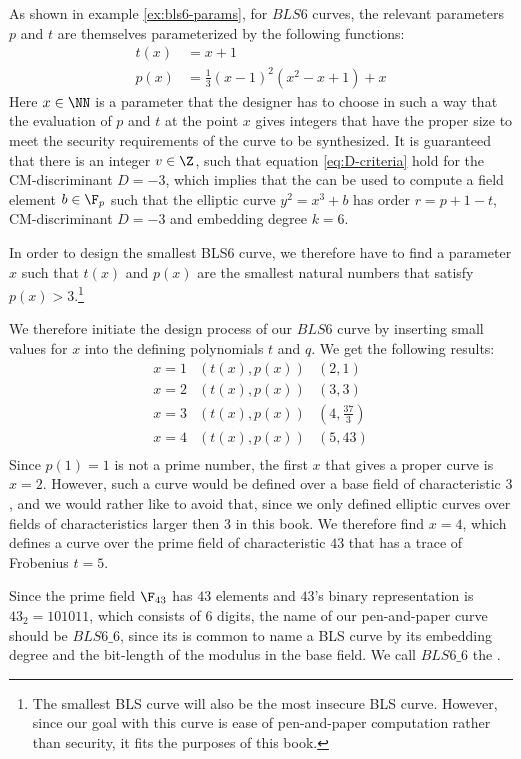 As shown in example \ref{ex:bls6-params}, for $BLS6$ curves, the relevant parameters $p$ and $t$ are themselves parameterized by the following functions:
\begin{equation}
\begin{split}
t(x) &= x+1\\
p(x) &= \frac{1}{3}(x-1)^2(x^{2}-x+1) +x
\end{split}
\end{equation}
Here $x\in\NN$ is a parameter that the designer has to choose in such a way that the evaluation of $p$ and $t$ at the point $x$ gives integers that have the proper size to meet the security requirements of the curve to be synthesized. It is guaranteed that there is an integer $v\in\Z$, such that equation \ref{eq:D-criteria} hold for the CM-discriminant $D=-3$, which implies that the  can be used to compute a field element $b\in\F_p$ such that the elliptic curve $y^2 = x^3 +b$ has order $r=p+1-t$, CM-discriminant $D=-3$ and embedding degree $k=6$. 

In order to design the smallest BLS6 curve, we therefore have to find a parameter $x$ such that $t(x)$ and $p(x)$ are the smallest natural numbers that satisfy $p(x)>3$.\footnote{The smallest BLS curve will also be the most insecure BLS curve. However, since our goal with this curve is ease of pen-and-paper computation rather than security, it fits the purposes of this book.}

We therefore initiate the design process of our $BLS6$ curve by inserting small values for $x$ into the defining polynomials $t$ and $q$. We get the following results:
$$
\begin{array}{lcr}
x=1 & (t(x),p(x)) & (2,1)\\
x=2 & (t(x),p(x)) & (3,3)\\
x=3 & (t(x),p(x)) & (4,\frac{37}{3})\\
x=4 & (t(x),p(x)) & (5,43)\\
\end{array}
$$
Since $p(1)=1$ is not a prime number, the first $x$ that gives a proper curve is $x=2$. However, such a curve would be defined over a base field of characteristic $3$, and we would rather like to avoid that, since we only defined elliptic curves over fields of characteristics larger then $3$ in this book. We therefore find $x=4$, which defines a curve over the prime field of characteristic $43$ that has a trace of Frobenius $t=5$. 

Since the prime field $\F_{43}$ has $43$ elements and $43$'s binary representation is $43_2= 101011$, which consists of $6$ digits, the name of our pen-and-paper curve should be $BLS6\_6$, since its is common to name a BLS curve by its embedding degree and the bit-length of the modulus in the base field. We call $BLS6\_6$ the .

